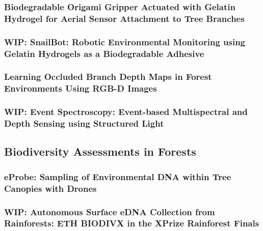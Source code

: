 \subsubsection{Biodegradable Origami Gripper Actuated with Gelatin Hydrogel for Aerial Sensor Attachment to Tree Branches \cite{Geckeler2023b}}

\subsubsection{WIP: SnailBot: Robotic Environmental Monitoring using Gelatin Hydrogels as a
Biodegradable Adhesive}

\subsubsection{Learning Occluded Branch Depth Maps in Forest Environments Using RGB-D Images \cite{Geckeler2024}}

\subsubsection{WIP: Event Spectroscopy: Event-based Multispectral and Depth Sensing using Structured Light}

\subsection{Biodiversity Assessments in Forests}

\subsubsection{eProbe: Sampling of Environmental DNA within Tree Canopies with Drones \cite{Kirchgeorg2024}}

\subsubsection{WIP: Autonomous Surface eDNA Collection from Rainforests: ETH BIODIVX in the XPrize Rainforest Finals}





